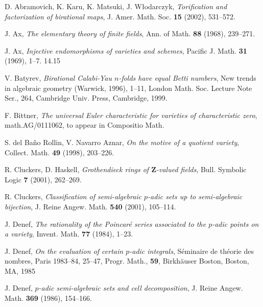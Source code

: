 \documentclass[english,12pt]{amsart}
\def\ZZ{{\mathbf Z}}
\theoremstyle{definition}
\theoremstyle{remark}
\theoremstyle{plain}
\numberwithin{equation}{subsection}
\def\ZZ{{\mathbf Z}}
\begin{document}

\begin{thebibliography}{SGA}

D. Abramovich, K. Karu, K. Matsuki,
J. W{\l}odarczyk,
\textit{Torification and factorization of birational
maps},
J. Amer. Math. Soc. \textbf{15} (2002), 531--572.




 J. Ax, 
\textit{The elementary theory of finite fields}, 
Ann. of Math.
\textbf{88} (1968), 239--271.



J. Ax, 
\textit{Injective endomorphisms of varieties and schemes}, 
Pacific J. Math. 
\textbf{31} (1969), 1--7.
14.15



V. Batyrev,
\textit{Birational Calabi-Yau $n$-folds have equal Betti numbers},
New trends in algebraic geometry (Warwick, 1996), 1--11, 
London Math. Soc. Lecture Note Ser., 264, 
Cambridge Univ. Press, Cambridge, 1999. 


F. Bittner,
\textit{The universal Euler characteristic
for varieties of characteristic zero},
math.AG/0111062, to appear in Compositio Math.



 S. del Ba{\~ n}o Rollin, V. Navarro Aznar,
\textit{On the motive of a quotient variety},
{Collect. Math.} \textbf{49} (1998),
203--226.



R. Cluckers, D. Haskell,
\textit{Grothendieck rings of $\ZZ$-valued fields},
Bull. Symbolic Logic \textbf{7} (2001), 262--269.


R. Cluckers,
\textit{Classification of semi-algebraic $p$-adic sets up to
semi-algebraic bijection}, J. Reine Angew. Math.
\textbf{540} (2001), 105--114. 

J. Denef,
\textit{The rationality of the Poincar{\'e}
series associated to the $p$-adic points on a variety}, 
Invent. Math. \textbf{77} (1984), 1--23. 


J. Denef,
\textit{On the evaluation of certain $p$-adic integrals},
S\'eminaire de th\'eorie des nombres, Paris
1983--84, 25--47, Progr. Math., \textbf{59}, Birkh\"auser
Boston, Boston, MA, 1985


J. Denef,
\textit{$p$-adic semi-algebraic sets and cell decomposition},
J. Reine Angew. Math. \textbf{369} (1986), 154--166.


\end{thebibliography}
\end{document}
